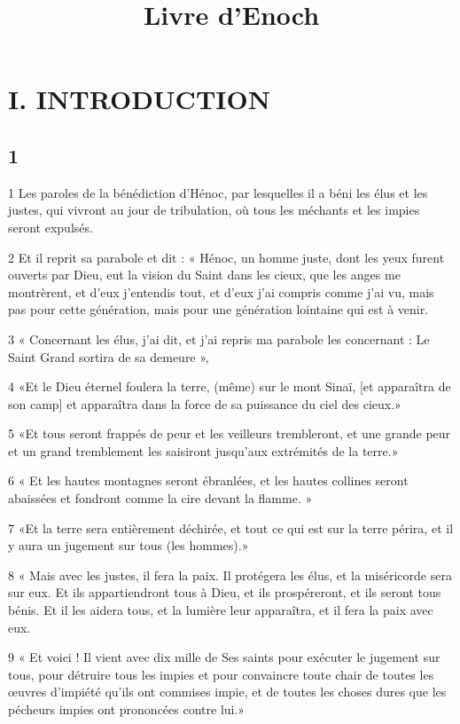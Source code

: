 

\title{Livre d'Enoch}

\part{I. INTRODUCTION}

\chapter{1}

\par 1 Les paroles de la bénédiction d'Hénoc, par lesquelles il a béni les élus et les justes, qui vivront au jour de tribulation, où tous les méchants et les impies seront expulsés.
\par 2 Et il reprit sa parabole et dit : « Hénoc, un homme juste, dont les yeux furent ouverts par Dieu, eut la vision du Saint dans les cieux, que les anges me montrèrent, et d'eux j'entendis tout, et d'eux j'ai compris comme j'ai vu, mais pas pour cette génération, mais pour une génération lointaine qui est à venir.
\par 3 « Concernant les élus, j'ai dit, et j'ai repris ma parabole les concernant : Le Saint Grand sortira de sa demeure »,
\par 4 «Et le Dieu éternel foulera la terre, (même) sur le mont Sinaï, [et apparaîtra de son camp] et apparaîtra dans la force de sa puissance du ciel des cieux.»
\par 5 «Et tous seront frappés de peur et les veilleurs trembleront, et une grande peur et un grand tremblement les saisiront jusqu'aux extrémités de la terre.»
\par 6 « Et les hautes montagnes seront ébranlées, et les hautes collines seront abaissées et fondront comme la cire devant la flamme. »
\par 7 «Et la terre sera entièrement déchirée, et tout ce qui est sur la terre périra, et il y aura un jugement sur tous (les hommes).»
\par 8 « Mais avec les justes, il fera la paix. Il protégera les élus, et la miséricorde sera sur eux. Et ils appartiendront tous à Dieu, et ils prospéreront, et ils seront tous bénis. Et il les aidera tous, et la lumière leur apparaîtra, et il fera la paix avec eux.
\par 9 « Et voici ! Il vient avec dix mille de Ses saints pour exécuter le jugement sur tous, pour détruire tous les impies et pour convaincre toute chair de toutes les œuvres d'impiété qu'ils ont commises impie, et de toutes les choses dures que les pécheurs impies ont prononcées contre lui.»

